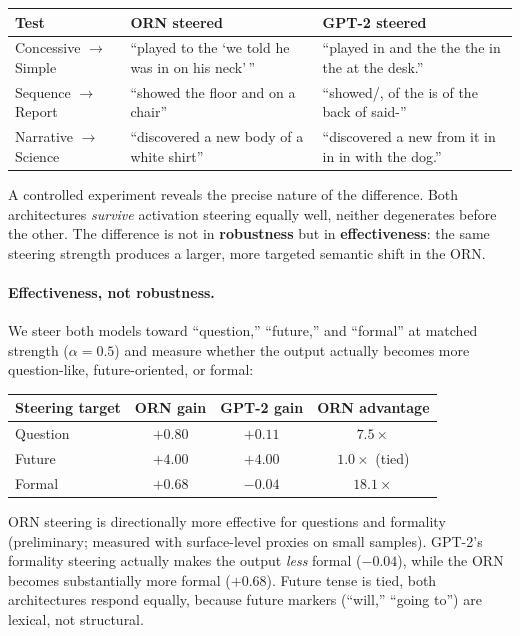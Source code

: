 \documentclass[11pt, a4paper]{article}
\theoremstyle{plain}
\theoremstyle{definition}
\theoremstyle{remark}
\begin{document}
\begin{center}\small
\begin{tabular}{lp{5.3cm}p{5.3cm}}
\toprule
\textbf{Test} & \textbf{ORN steered} & \textbf{GPT-2 steered} \\
\midrule
Concessive $\to$ Simple & ``played to the `we told he was in on his neck'\,'' & ``played in and the the the in the at the desk.'' \\
Sequence $\to$ Report & ``showed the floor and on a chair'' & ``showed/, of the is of the back of said-'' \\
Narrative $\to$ Science & ``discovered a new body of a white shirt'' & ``discovered a new from it in in in with the dog.'' \\
\bottomrule
\end{tabular}
\end{center}

A controlled experiment reveals the precise nature of the difference.
Both architectures \emph{survive} activation steering equally well, neither degenerates before the other.
The difference is not in \textbf{robustness} but in \textbf{effectiveness}: the same steering strength produces a larger, more targeted semantic shift in the ORN.

\paragraph{Effectiveness, not robustness.}
We steer both models toward ``question,'' ``future,'' and ``formal'' at matched strength ($\alpha{=}0.5$) and measure whether the output actually becomes more question-like, future-oriented, or formal:

\begin{center}\small
\begin{tabular}{lccc}
\toprule
\textbf{Steering target} & \textbf{ORN gain} & \textbf{GPT-2 gain} & \textbf{ORN advantage} \\
\midrule
Question & $+0.80$ & $+0.11$ & $7.5\times$ \\
Future & $+4.00$ & $+4.00$ & $1.0\times$ (tied) \\
Formal & $+0.68$ & $-0.04$ & $18.1\times$ \\
\bottomrule
\end{tabular}
\end{center}

ORN steering is directionally more effective for questions and formality (preliminary; measured with surface-level proxies on small samples).
GPT-2's formality steering actually makes the output \emph{less} formal ($-0.04$), while the ORN becomes substantially more formal ($+0.68$).
Future tense is tied, both architectures respond equally, because future markers (``will,'' ``going to'') are lexical, not structural.
\end{document}
